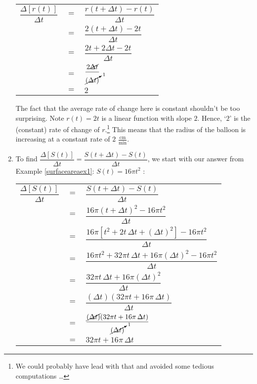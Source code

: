 \documentclass{ximera}
\begin{document}
\begin{example}
\begin{enumerate}
\begin{longtable}{rcl}
$ \dfrac{\Delta[r(t)]}{\Delta t}$ & $=$ & $\dfrac{r(t+ \Delta t) - r(t)}{\Delta t}$ \\[10pt]
                          &$=$ &   $\dfrac{2(t+\Delta t)- 2t}{\Delta t}$ \\[10pt]
                                  & $=$ &   $\dfrac{2t + 2 \Delta t - 2t}{\Delta t}$ \\[10pt]
                                     & $=$ &   $\dfrac{ 2 \cancel{\Delta t} }{\cancelto{1}{(\Delta t)}}$ \\[10pt]
                         &$=$ &    $2$ \\ \end{longtable}
                         
The fact that the average rate of change here is constant shouldn't be too surprising.  Note $r(t) = 2t$ is a linear function with slope $2$.  Hence, `$2$' is the (constant) rate of change of $r$.\footnote{We could probably have lead with that and avoided some tedious computations \ldots}  This means that the radius of the balloon is increasing at a constant rate of $2$ $\frac{\text{cm}}{\text{min}}$.


                         
\item  To find  $\dfrac{\Delta[S(t)]}{\Delta t} = \dfrac{S(t+ \Delta t) - S(t)}{\Delta t}$, we start with our answer from Example \ref{surfaceareaex1}:  $S(t) =  16 \pi t^{2}$ :

\begin{longtable}{rcl}

 $\dfrac{\Delta[S(t)]}{\Delta t}$ & $=$ &$\dfrac{S(t+ \Delta t) - S(t)}{\Delta t}$   \\[10pt]
                         & $=$ & $\dfrac{16 \pi (t+ \Delta t)^2 - 16 \pi t^2}{\Delta t}$ \\[10pt]
                         & $=$ & $\dfrac{16 \pi \left[ t^2 + 2 t \, \Delta t + (\Delta t)^2\right]  - 16 \pi t^2}{\Delta t}$ \\[10pt]
                         & $=$ & $\dfrac{16 \pi t^2 + 32 \pi t \, \Delta t + 16 \pi (\Delta t)^2   - 16 \pi t^2}{\Delta t}$ \\[10pt]
                         & $=$ & $\dfrac{32 \pi t \, \Delta t + 16 \pi (\Delta t)^2}{\Delta t}$ \\[10pt]
                         & $=$ & $\dfrac{(\Delta t) (32 \pi t + 16 \pi \, \Delta t)}{\Delta t}$ \\[10pt]
                         & $=$ & $\dfrac{\cancel{(\Delta t)} (32 \pi t + 16 \pi \, \Delta t)}{\cancelto{1}{(\Delta t)}}$ \\[10pt]
                         & $=$ & $32 \pi t + 16 \pi \, \Delta t$  \\ \end{longtable}
                         

\end{enumerate}
\end{example}
\end{document}
